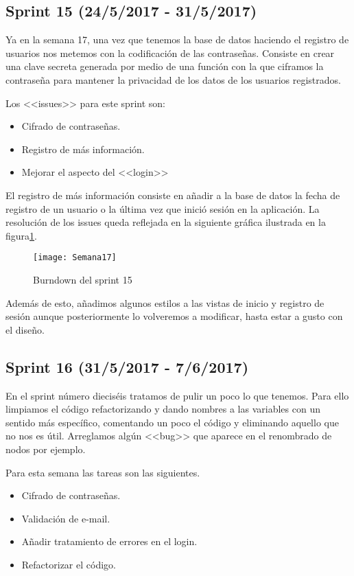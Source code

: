 \subsection{Sprint 15 (24/5/2017 - 31/5/2017)}

Ya en la semana 17, una vez que tenemos la base de datos haciendo el registro de usuarios nos metemos con la codificación de las contraseñas. Consiste en crear una clave secreta generada por medio de una función con la que ciframos la contraseña para mantener la privacidad de los datos de los usuarios registrados. 

Los <<issues>> para este sprint son:
\begin{itemize}
\item Cifrado de contraseñas.
\item Registro de más información.
\item Mejorar el aspecto del <<login>>
\end{itemize}

El registro de más información consiste en añadir a la base de datos la fecha de registro de un usuario o la última vez que inició sesión en la aplicación. La resolución de los issues queda reflejada en la siguiente gráfica ilustrada en la figura\ref{fig:A.14}.

\begin{figure}[h]
\centering
\texttt{[image: Semana17]}
\caption{Burndown del sprint 15}
\label{fig:A.14}
\end{figure}

Además de esto, añadimos algunos estilos a las vistas de inicio y registro de sesión aunque posteriormente lo volveremos a modificar, hasta estar a gusto con el diseño.

\subsection{Sprint 16 (31/5/2017 - 7/6/2017)}

En el sprint número dieciséis tratamos de pulir un poco lo que tenemos. Para ello limpiamos el código refactorizando y dando nombres a las variables con un sentido más específico, comentando un poco el código y eliminando aquello que no nos es útil. Arreglamos algún <<bug>> que aparece en el renombrado de nodos por ejemplo.


Para esta semana las tareas son las siguientes.
\begin{itemize}
\item Cifrado de contraseñas.
\item Validación de e-mail.
\item Añadir tratamiento de errores en el login.
\item Refactorizar el código.
\end{itemize}

